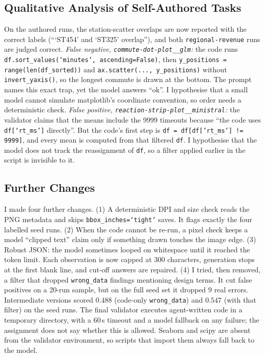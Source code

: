 \documentclass[11pt]{article}
\begin{document}
\subsection{Qualitative Analysis of Self-Authored Tasks}
On the authored runs, the station-scatter overlaps are now reported with the
correct labels (```ST454' and `ST325' overlap''), and both
\texttt{regional-revenue} runs are judged correct. \emph{False negative,
\texttt{commute-dot-plot\_\_glm}:} the code runs
\texttt{df.sort\_values(`minutes', ascending=False)}, then
\texttt{y\_positions = range(len(df\_sorted))} and \texttt{ax.scatter(...,
y\_positions)} without \texttt{invert\_yaxis()}, so the longest commute is drawn
at the bottom. The prompt names this exact trap, yet the model answers ``ok''.
I hypothesise that a small model cannot simulate matplotlib's coordinate
convention, so order needs a deterministic check. \emph{False positive,
\texttt{reaction-strip-plot\_\_ministral}:} the validator claims that the means
include the 9999 timeouts because ``the code uses \texttt{df[`rt\_ms']}
directly''. But the code's first step is \texttt{df = df[df['rt\_ms'] != 9999]},
and every mean is computed from that filtered \texttt{df}. I hypothesise that
the model does not track the reassignment of \texttt{df}, so a filter applied
earlier in the script is invisible to it.

\subsection{Further Changes}
I made four further changes. (1) A deterministic DPI and size check reads the
PNG metadata and skips \texttt{bbox\_inches=`tight'} saves. It flags exactly the
four labelled seed runs. (2) When the code cannot be re-run, a pixel check
keeps a model ``clipped text'' claim only if something drawn touches the
image edge. (3) Robust JSON: the model sometimes looped on whitespace until it
reached the token limit. Each observation is now capped at 300 characters,
generation stops at the first blank line, and cut-off answers are repaired.
(4) I tried, then removed, a filter that dropped \texttt{wrong\_data} findings
mentioning design terms. It cut false positives on a 20-run sample, but on the
full seed set it dropped 9 real errors. Intermediate versions scored $0.488$
(code-only \texttt{wrong\_data}) and $0.547$ (with that filter) on the seed
runs. The final validator executes agent-written code in a temporary
directory, with a 60\,s timeout and a model fallback on any failure; the
assignment does not say whether this is allowed. Seaborn and scipy are absent
from the validator environment, so scripts that import them always fall back
to the model.
\end{document}
